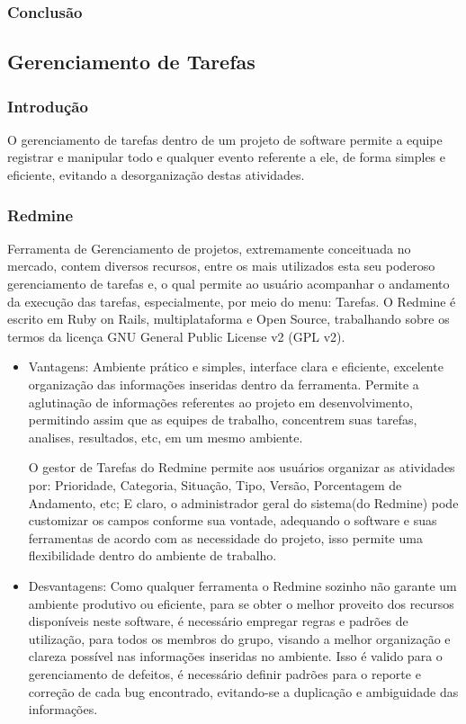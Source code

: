 \documentclass[12pt,a4paper]{article}
\begin{document}
		\subsubsection{Conclusão}

	\clearpage		
	\subsection{Gerenciamento de Tarefas}
		\subsubsection{Introdução}
		
			O gerenciamento de tarefas dentro de um projeto de software permite a equipe registrar e manipular todo e qualquer evento referente a ele, de forma simples e eficiente, evitando a desorganização destas atividades. 

		\subsubsection{Redmine}
			
			Ferramenta de Gerenciamento de projetos, extremamente conceituada no mercado, contem diversos recursos, entre os mais utilizados esta seu poderoso gerenciamento de tarefas e, o qual permite ao usuário acompanhar o andamento da  execução das tarefas, especialmente, por meio do menu: Tarefas.
			O Redmine é escrito em Ruby on Rails, multiplataforma e Open Source, trabalhando sobre os termos da licença GNU General Public License v2 (GPL v2).
		
		\begin{itemize}
			\item Vantagens: 
			Ambiente prático e simples, interface clara e eficiente, excelente organização das informações inseridas dentro da ferramenta. Permite a aglutinação de informações referentes ao projeto em desenvolvimento, permitindo assim que as equipes de trabalho, concentrem suas tarefas, analises, resultados, etc, em um mesmo ambiente. 
			
			O gestor de Tarefas do Redmine permite aos usuários organizar as atividades por: Prioridade, Categoria, Situação, Tipo, Versão, Porcentagem de Andamento, etc; E claro, o administrador geral do sistema(do Redmine) pode customizar os campos conforme sua vontade, adequando o software e suas ferramentas de acordo com as necessidade do projeto, isso permite uma flexibilidade dentro do ambiente de trabalho.
			\item Desvantagens: 
			Como qualquer ferramenta o Redmine sozinho não garante um ambiente produtivo ou eficiente, para se obter o melhor proveito dos recursos disponíveis neste software, é necessário empregar regras e padrões de utilização, para todos os membros do grupo, visando a melhor organização e clareza possível nas informações inseridas no ambiente. Isso é valido para o gerenciamento de defeitos, é necessário definir padrões para o reporte e correção de cada bug encontrado, evitando-se a duplicação e ambiguidade das informações. 
		\end{itemize}
		
\end{document}

